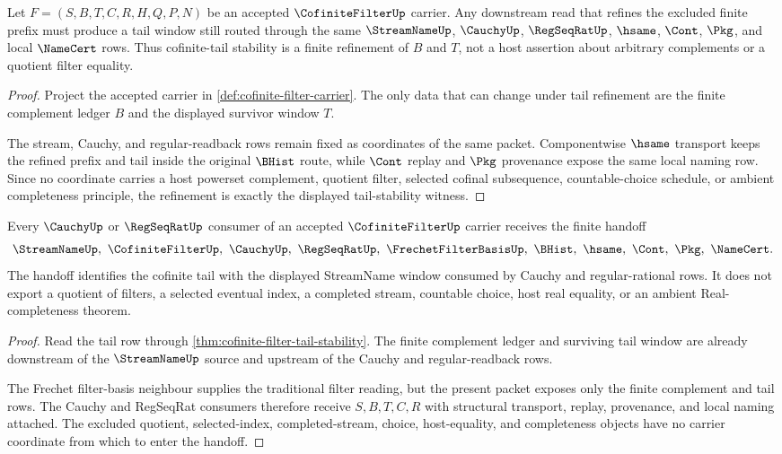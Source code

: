 \begin{theorem}
\label{thm:cofinite-filter-tail-stability}
Let $F=(S,B,T,C,R,H,Q,P,N)$ be an accepted $\CofiniteFilterUp$ carrier. Any downstream read that refines the excluded finite prefix must produce a tail window still routed through the same $\StreamNameUp$, $\CauchyUp$, $\RegSeqRatUp$, $\hsame$, $\Cont$, $\Pkg$, and local $\NameCert$ rows. Thus cofinite-tail stability is a finite refinement of $B$ and $T$, not a host assertion about arbitrary complements or a quotient filter equality.
\end{theorem}
\begin{proof}
Project the accepted carrier in \autoref{def:cofinite-filter-carrier}. The only data that can change under tail refinement are the finite complement ledger $B$ and the displayed survivor window $T$.

The stream, Cauchy, and regular-readback rows remain fixed as coordinates of the same packet. Componentwise $\hsame$ transport keeps the refined prefix and tail inside the original $\BHist$ route, while $\Cont$ replay and $\Pkg$ provenance expose the same local naming row. Since no coordinate carries a host powerset complement, quotient filter, selected cofinal subsequence, countable-choice schedule, or ambient completeness principle, the refinement is exactly the displayed tail-stability witness.
\end{proof}

\begin{theorem}
\label{thm:cofinite-filter-cauchy-window-handoff}
Every $\CauchyUp$ or $\RegSeqRatUp$ consumer of an accepted $\CofiniteFilterUp$ carrier receives the finite handoff
$$
\StreamNameUp,\ \CofiniteFilterUp,\ \CauchyUp,\ \RegSeqRatUp,\ \FrechetFilterBasisUp,\ \BHist,\ \hsame,\ \Cont,\ \Pkg,\ \NameCert .
$$
The handoff identifies the cofinite tail with the displayed StreamName window consumed by Cauchy and regular-rational rows. It does not export a quotient of filters, a selected eventual index, a completed stream, countable choice, host real equality, or an ambient Real-completeness theorem.
\end{theorem}
\begin{proof}
Read the tail row through \autoref{thm:cofinite-filter-tail-stability}. The finite complement ledger and surviving tail window are already downstream of the $\StreamNameUp$ source and upstream of the Cauchy and regular-readback rows.

The Frechet filter-basis neighbour supplies the traditional filter reading, but the present packet exposes only the finite complement and tail rows. The Cauchy and RegSeqRat consumers therefore receive $S,B,T,C,R$ with structural transport, replay, provenance, and local naming attached. The excluded quotient, selected-index, completed-stream, choice, host-equality, and completeness objects have no carrier coordinate from which to enter the handoff.
\end{proof}

